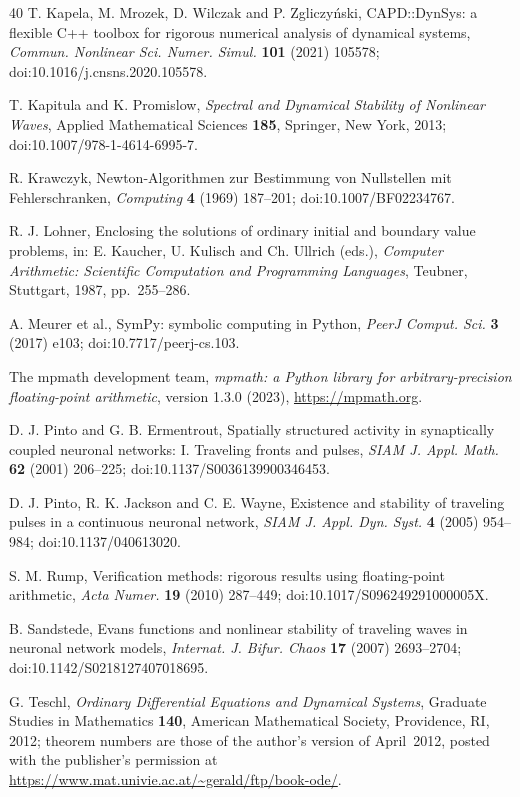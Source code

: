 \documentclass[11pt]{article}
\theoremstyle{definition}
\begin{document}
\begin{thebibliography}{40}
 T. Kapela, M. Mrozek, D. Wilczak and P. Zgliczy\'nski, CAPD::DynSys: a flexible C++ toolbox for rigorous numerical analysis of dynamical systems, \emph{Commun. Nonlinear Sci. Numer. Simul.} \textbf{101} (2021) 105578; doi:10.1016/j.cnsns.2020.105578.

 T. Kapitula and K. Promislow, \emph{Spectral and Dynamical Stability of Nonlinear Waves}, Applied Mathematical Sciences \textbf{185}, Springer, New York, 2013; doi:10.1007/978-1-4614-6995-7.

 R. Krawczyk, Newton-Algorithmen zur Bestimmung von Nullstellen mit Fehlerschranken, \emph{Computing} \textbf{4} (1969) 187--201; doi:10.1007/BF02234767.

 R. J. Lohner, Enclosing the solutions of ordinary initial and boundary value problems, in: E. Kaucher, U. Kulisch and Ch. Ullrich (eds.), \emph{Computer Arithmetic: Scientific Computation and Programming Languages}, Teubner, Stuttgart, 1987, pp.~255--286.

 A. Meurer et al., SymPy: symbolic computing in Python, \emph{PeerJ Comput. Sci.} \textbf{3} (2017) e103; doi:10.7717/peerj-cs.103.

 The mpmath development team, \emph{mpmath: a Python library for arbitrary-precision floating-point arithmetic}, version 1.3.0 (2023), \url{https://mpmath.org}.

 D. J. Pinto and G. B. Ermentrout, Spatially structured activity in synaptically coupled neuronal networks: I. Traveling fronts and pulses, \emph{SIAM J. Appl. Math.} \textbf{62} (2001) 206--225; doi:10.1137/S0036139900346453.

 D. J. Pinto, R. K. Jackson and C. E. Wayne, Existence and stability of traveling pulses in a continuous neuronal network, \emph{SIAM J. Appl. Dyn. Syst.} \textbf{4} (2005) 954--984; doi:10.1137/040613020.

 S. M. Rump, Verification methods: rigorous results using floating-point arithmetic, \emph{Acta Numer.} \textbf{19} (2010) 287--449; doi:10.1017/S096249291000005X.

 B. Sandstede, Evans functions and nonlinear stability of traveling waves in neuronal network models, \emph{Internat. J. Bifur. Chaos} \textbf{17} (2007) 2693--2704; doi:10.1142/S0218127407018695.

 G. Teschl, \emph{Ordinary Differential Equations and Dynamical Systems}, Graduate Studies in Mathematics \textbf{140}, American Mathematical Society, Providence, RI, 2012; theorem numbers are those of the author's version of April~2012, posted with the publisher's permission at \url{https://www.mat.univie.ac.at/~gerald/ftp/book-ode/}.


\end{thebibliography}
\end{document}
